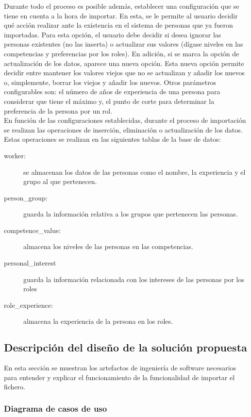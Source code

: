 Durante todo el proceso es posible además, establecer una configuración que se tiene en cuenta a la hora de importar. En esta, se le permite al usuario decidir qué acción realizar ante la existencia en el sistema de personas que ya fueron importadas. Para esta opción, el usuario debe decidir si desea ignorar las personas existentes (no las inserta) o actualizar sus valores (dígase niveles en las competencias y preferencias por los roles). En adición, si se marca la opción de actualización de los datos, aparece una nueva opción. Esta nueva opción permite decidir entre mantener los valores viejos que no se actualizan y añadir los nuevos o, simplemente, borrar los viejos y añadir los nuevos. Otros parámetros configurables son: el número de años de experiencia de una persona para considerar que tiene el máximo y, el punto de corte para determinar la preferencia de la persona por un rol. \\

En función de las configuraciones establecidas, durante el proceso de importación se realizan las operaciones de inserción, eliminación o actualización de los datos. Estas operaciones se realizan en las siguientes tablas de la base de datos:
\begin{description}
	\item[worker:] se almacenan los datos de las personas como el nombre, la experiencia y el grupo al que pertenecen.
	\item[person\_group:] guarda la información relativa a los grupos que pertenecen las personas.
	\item[competence\_value:] almacena los niveles de las personas en las competencias. 
	\item[personal\_interest] guarda la información relacionada con los intereses de las personas por los roles 
	\item[role\_experience:] almacena la experiencia de la persona en los roles.
\end{description}

\subsection{Descripción del diseño de la solución propuesta}

En esta sección se muestran los artefactos de ingeniería de software necesarios para entender y explicar el funcionamiento de la funcionalidad de importar el fichero.

\subsubsection{Diagrama de casos de uso}

